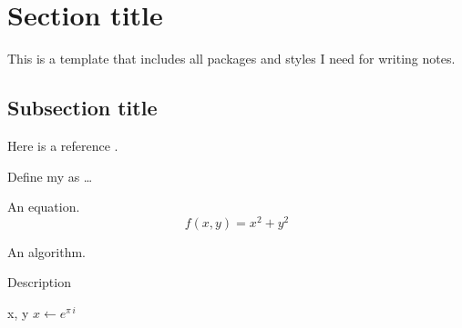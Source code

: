 \documentclass[a4paper]{article}
\begin{document}






\newpage
\tableofcontents
\newpage



\section{Section title}

This is a template that includes all packages and styles I need for writing notes.


\subsection{Subsection title}

Here is a reference \cite{ref_example}.
\begin{definition}
Define my  as \ldots
\end{definition}

An equation.
\begin{equation}
    f(x,y) = x^2 + y^2
\end{equation}

An algorithm.
\begin{algorithm}[H]
\caption{Description}
\begin{algorithmic}[1]
 {x, y} 
\State $x\leftarrow e^{\pi\, i}$
\State
{}
\State
\EndIf
\EndProcedure
\end{algorithmic}
\end{algorithm}
\end{document}
